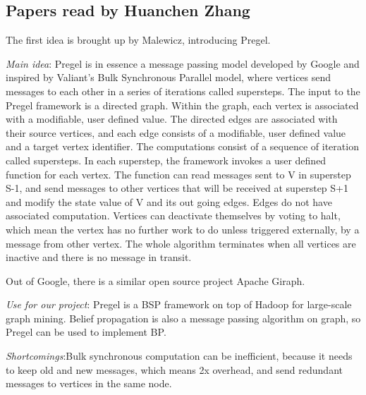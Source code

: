 \subsection{Papers read by Huanchen Zhang}
The first idea is brought up by Malewicz, introducing Pregel\cite{Malewicz2010:PSL:1807167.1807184}.
\begin{itemize*}
\item {\em Main idea}: Pregel is in essence a message passing model developed by Google and inspired by Valiant’s Bulk Synchronous Parallel model, where vertices send messages to each other in a series of iterations called supersteps. The input to the Pregel framework is a directed graph. Within the graph, each vertex is associated with a modifiable, user defined value. The directed edges are associated with their source vertices, and each edge consists of a modifiable, user defined value and a target vertex identifier. The computations consist of a sequence of iteration called supersteps. In each superstep, the framework invokes a user defined function for each vertex. The function can read messages sent to V in superstep S-1, and send messages to other vertices that will be received at superstep S+1 and modify the state value of V and its out going edges. Edges do not have associated computation. Vertices can deactivate themselves by voting to halt, which mean the vertex has no further work to do unless triggered externally, by a message from other vertex. The whole algorithm terminates when all vertices are inactive and there is no message in transit.

Out of Google, there is a similar open source project Apache Giraph.
\item {\em Use for our project}: Pregel is a BSP framework on top of Hadoop for large-scale graph mining. Belief propagation is also a message passing algorithm on graph, so Pregel can be used to implement BP.
\item {\em Shortcomings}:Bulk synchronous computation can be inefficient, because it needs to keep old and new messages, which means 2x overhead, and send redundant messages to vertices in the same node.
\end{itemize*}

